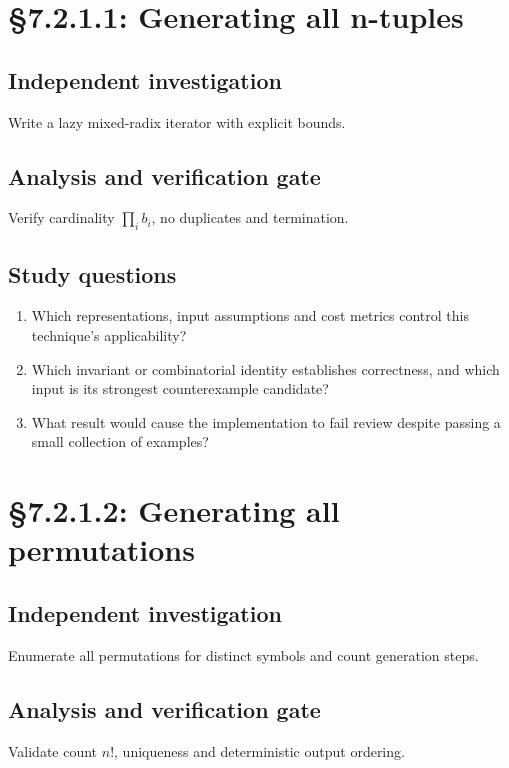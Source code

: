 \documentclass[11pt,letterpaper]{article}
\begin{document}
\section{\S 7.2.1.1: Generating all n-tuples}
\subsection{Independent investigation}
Write a lazy mixed-radix iterator with explicit bounds.
\subsection{Analysis and verification gate}
Verify cardinality $\prod_i b_i$, no duplicates and termination.
\subsection{Study questions}
\begin{enumerate}
\item Which representations, input assumptions and cost metrics control this technique's applicability?
\item Which invariant or combinatorial identity establishes correctness, and which input is its strongest counterexample candidate?
\item What result would cause the implementation to fail review despite passing a small collection of examples?
\end{enumerate}

\section{\S 7.2.1.2: Generating all permutations}
\subsection{Independent investigation}
Enumerate all permutations for distinct symbols and count generation steps.
\subsection{Analysis and verification gate}
Validate count $n!$, uniqueness and deterministic output ordering.
\end{document}
